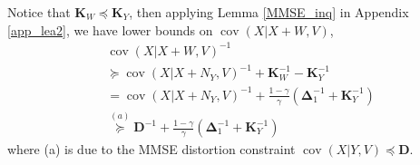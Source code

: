\documentclass[journal,final, onecolumn]{IEEEtran}
\DeclareMathOperator{\cov}{cov}
\begin{document}
Notice that $\boldsymbol{K}_{W} \preceq \boldsymbol{K}_{Y}$, then
applying Lemma \ref{MMSE_inq} in Appendix \ref{app_lea2}, we have lower bounds on $\cov (X | X+W, V)$,
\begin{align}
&\cov(X|X+W,V)^{-1}\nonumber \\
 & \succeq \cov(X|X+N_{Y},V)^{-1} + \boldsymbol{K}_{W}^{-1} - \boldsymbol{K}_{Y}^{-1} \\
&= \cov(X|X+N_{Y},V)^{-1} +\frac{1-\gamma}{\gamma} \left( \boldsymbol{\Delta}_{1}^{-1} +  \boldsymbol{K}_{Y}^{-1} \right)\\
& \overset{(a)}\succeq \boldsymbol{D}^{-1} + \frac{1-\gamma}{\gamma} \left(  \boldsymbol{\Delta}^{-1}_{1} +  \boldsymbol{K}^{-1}_{Y}     \right)\label{eq:567}
\end{align}
where (a) is due to the MMSE distortion constraint $\cov (X | Y, V)\preceq \boldsymbol{D}$.
\end{document}
